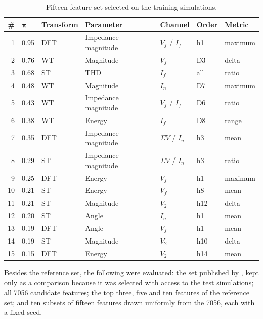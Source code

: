 \documentclass[11pt,a4paper]{article}
\newcommand{\note}[1]{\par\vspace{0.3em}{\footnotesize\raggedright #1\par}}
\begin{document}
\begin{table}[htb]
  \centering
  \caption{Fifteen-feature set selected on the training simulations.}
  \label{tab:top15}
  \begin{tabular}{rllllll}
  \toprule
  \textbf{\#} & $\boldsymbol{\pi}$ & \textbf{Transform} & \textbf{Parameter} & \textbf{Channel} & \textbf{Order} & \textbf{Metric} \\
  \midrule
  1 & 0.95 & DFT & Impedance magnitude & $V_f$ / $I_f$ & h1 & maximum \\
  2 & 0.76 & WT & Magnitude & $V_f$ & D3 & delta \\
  3 & 0.68 & ST & THD & $I_f$ & all & ratio \\
  4 & 0.48 & WT & Magnitude & $I_n$ & D7 & maximum \\
  5 & 0.43 & WT & Impedance magnitude & $V_f$ / $I_f$ & D6 & ratio \\
  6 & 0.38 & WT & Energy & $I_f$ & D8 & range \\
  7 & 0.35 & DFT & Impedance magnitude & $\Sigma V$ / $I_n$ & h3 & mean \\
  8 & 0.29 & ST & Impedance magnitude & $\Sigma V$ / $I_n$ & h3 & ratio \\
  9 & 0.25 & DFT & Energy & $V_f$ & h1 & maximum \\
  10 & 0.21 & ST & Energy & $V_f$ & h8 & mean \\
  11 & 0.21 & ST & Magnitude & $V_2$ & h12 & delta \\
  12 & 0.20 & ST & Angle & $I_n$ & h1 & mean \\
  13 & 0.19 & DFT & Angle & $V_f$ & h1 & mean \\
  14 & 0.19 & ST & Magnitude & $V_2$ & h10 & delta \\
  15 & 0.15 & DFT & Energy & $V_2$ & h14 & mean \\
  \bottomrule
  \end{tabular}
  \note{$\pi$: selection frequency over the hundred runs; DFT, ST and WT: discrete Fourier, Stockwell and wavelet transforms; THD: total harmonic distortion; $V_f$ and $I_f$: faulted-phase voltage and current; $I_n$: neutral current; $\Sigma V$: sum of the three phase voltages; $V_2$: negative-sequence voltage; h$n$: harmonic order; D$n$: dyadic band of the WT.}
\end{table}

Besides the reference set, the following were evaluated: the set published by \citet{martins_tcc_en}, kept only as a comparison because it was selected with access to the test simulations; all 7056 candidate features; the top three, five and ten features of the reference set; and ten subsets of fifteen features drawn uniformly from the 7056, each with a fixed seed.
\end{document}
